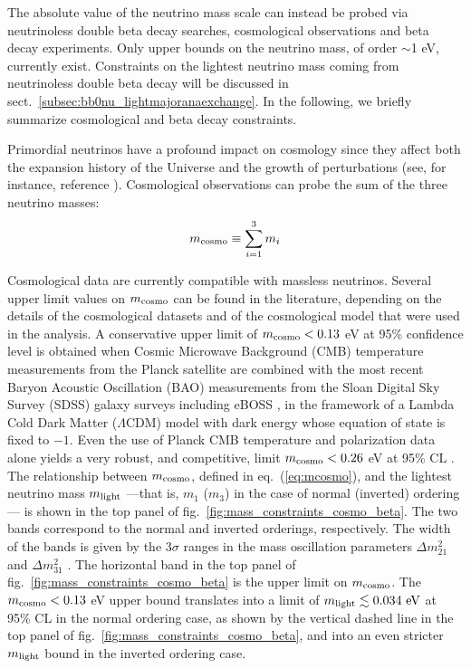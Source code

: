 The absolute value of the neutrino mass scale can instead be probed via neutrinoless double beta decay searches, cosmological observations and beta decay experiments. Only upper bounds on the neutrino mass, of order $\sim$1 eV, currently exist. Constraints on the lightest neutrino mass coming from neutrinoless double beta decay will be discussed in sect.~\ref{subsec:bb0nu_lightmajoranaexchange}. In the following, we briefly summarize cosmological and beta decay constraints.

Primordial neutrinos have a profound impact on cosmology since they affect both the expansion history of the Universe and the growth of perturbations (see, for instance, reference \cite{Lesgourgues:2006nd}). Cosmological observations  can probe the sum of the three neutrino masses:
%
\begin{equation}
m_{{\rm cosmo}}\equiv \sum_{i=1}^3 m_i 
\label{eq:mcosmo}
\end{equation}
% 

Cosmological data are currently compatible with massless neutrinos. Several upper limit values on $m_{{\rm cosmo}}$ can be found in the literature, depending on the details of the cosmological datasets and of the cosmological model that were used in the analysis. A conservative upper limit of $m_{{\rm cosmo}} < 0.13$ eV at 95\% confidence level is obtained when Cosmic Microwave Background (CMB) temperature measurements from the Planck satellite \cite{Planck:2018vyg} are combined with the most recent Baryon Acoustic Oscillation (BAO) measurements from the Sloan Digital Sky Survey (SDSS) galaxy surveys including eBOSS \cite{eBOSS:2020yzd}, in the framework of a Lambda Cold Dark Matter ($\Lambda$CDM) model with dark energy whose equation of state is fixed to $-1$. Even the use of Planck CMB temperature and polarization data alone yields a very robust, and competitive, limit $m_{{\rm cosmo}} < 0.26$ eV at 95\% CL \cite{Planck:2018vyg}.
The relationship between $m_{{\rm cosmo}}$, defined in eq.~(\ref{eq:mcosmo}), and the lightest neutrino mass $m_{{\rm light}}$ ---that is, $m_1$ ($m_3$) in the case of normal (inverted) ordering--- is shown in the top panel of fig.~\ref{fig:mass_constraints_cosmo_beta}. The two bands correspond to the normal and inverted orderings, respectively. The width of the bands is given by the 3$\sigma$ ranges in the mass oscillation parameters $\Delta m^2_{{21}}$ and $\Delta m^2_{{31}}$ \cite{Esteban:2020cvm}. The horizontal band in the top panel of fig.~\ref{fig:mass_constraints_cosmo_beta} is the upper limit on $m_{{\rm cosmo}}$. The $m_{{\rm cosmo}} < 0.13$ eV upper bound translates into a limit of $m_{{\rm light}}\lesssim 0.034\ {\rm eV}$ at 95\% CL in the normal ordering case, as shown by the vertical dashed line in the top panel of fig.~\ref{fig:mass_constraints_cosmo_beta}, and into an even stricter $m_{{\rm light}}$ bound in the inverted ordering case.

